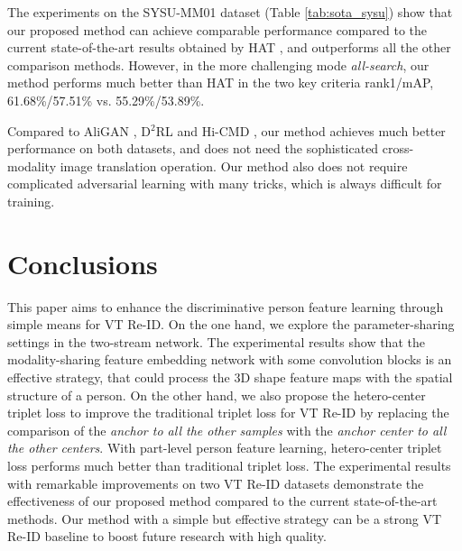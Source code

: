 \documentclass[journal]{IEEEtran}
\begin{document}
The experiments on the SYSU-MM01 dataset (Table \ref{tab:sota_sysu}) show that our proposed method can achieve comparable performance compared to the current state-of-the-art results obtained by HAT \cite{ye2018vipr}, and outperforms all the other comparison methods. However, in the more challenging mode \emph{all-search}, our method performs much better than HAT \cite{ye2018vipr} in the two key criteria rank1/mAP, 61.68\%/57.51\% vs. 55.29\%/53.89\%.

Compared to AliGAN \cite{wang2019rgb}, D$^2$RL \cite{wang2019learning1}and Hi-CMD \cite{choi2020hi}, our method achieves much better performance on both datasets, and does not need the sophisticated cross-modality image translation operation. Our method also does not require complicated adversarial learning with many tricks, which is always difficult for training.


\section{Conclusions}
This paper aims to enhance the discriminative person feature learning through simple means for VT Re-ID.
On the one hand, we explore the parameter-sharing settings in the two-stream network. The experimental results show that the modality-sharing feature embedding network with some convolution blocks is an effective strategy, that could process the 3D shape feature maps with the spatial structure of a person.
On the other hand, we also propose the hetero-center triplet loss to improve the traditional triplet loss for VT Re-ID by replacing the comparison of the \emph{anchor to all the other samples} with the \emph{anchor center to all the other centers}. With part-level person feature learning, hetero-center triplet loss performs much better than traditional triplet loss.
The experimental results with remarkable improvements on two VT Re-ID datasets demonstrate the effectiveness of our proposed method compared to the current state-of-the-art methods. Our method with a simple but effective strategy can be a strong VT Re-ID baseline to boost future research with high quality.





\end{document}
